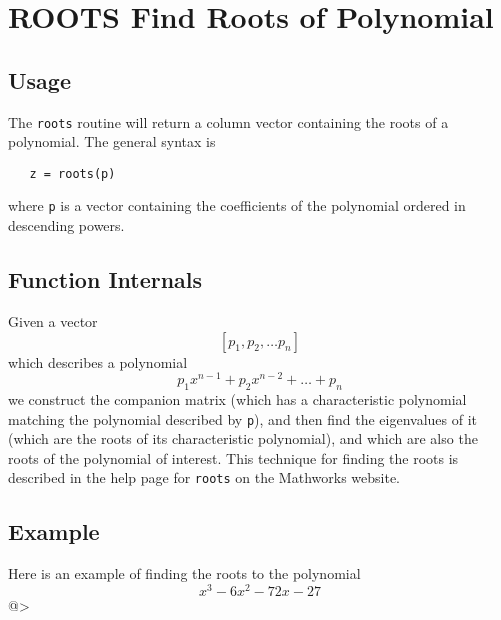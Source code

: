 \section{ROOTS Find Roots of Polynomial}

\subsection{Usage}

The \verb|roots| routine will return a column vector containing the
roots of a polynomial.  The general syntax is
\begin{verbatim}
   z = roots(p)
\end{verbatim}
where \verb|p| is a vector containing the coefficients of the polynomial
ordered in descending powers.  
\subsection{Function Internals}

Given a vector 
\[
   [p_1, p_2, \dots p_n]
\]
which describes a polynomial
\[
   p_1 x^{n-1} + p_2 x^{n-2} + \dots + p_n
\]
we construct the companion matrix (which has a characteristic polynomial
matching the polynomial described by \verb|p|), and then find the eigenvalues
of it (which are the roots of its characteristic polynomial), and
which are also the roots of the polynomial of interest.  This technique
for finding the roots is described in the help page for \verb|roots| on the Mathworks
website.
\subsection{Example}

Here is an example of finding the roots to the polynomial
\[
   x^3 - 6x^2 - 72x - 27
\]
@>
